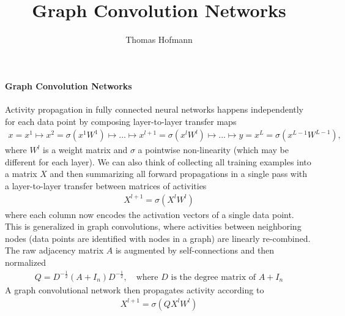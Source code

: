 \documentclass[12pt,a4paper]{article}
\author{Thomas Hofmann}
\title{Graph Convolution Networks}
\begin{document}
\maketitle

\paragraph{Graph Convolution Networks}
Activity propagation in fully connected neural networks happens independently for each data point by composing layer-to-layer transfer maps 
\begin{align}
x= x^1 \mapsto x^2 = \sigma(x^1 W^1) \mapsto ... \mapsto  x^{l+1} = \sigma(x^l W^l) \mapsto ... \mapsto y=x^L = \sigma(x^{L-1} W^{L-1} ),
\end{align}
where $W^l$ is a weight matrix and $\sigma$ a pointwise non-linearity (which may be different for each layer). We can also think of collecting all training examples into a matrix $X$ and then summarizing all forward propagations in a single pass with a layer-to-layer transfer between matrices of activities 
\begin{align}
X^{l+1} = \sigma(X^l W^{l} )
\end{align}
where each column  now encodes the activation vectors of a single data point. This is generalized in graph convolutions, where activities between neighboring nodes (data points are identified with nodes in a graph) are linearly re-combined. The raw adjacency matrix $A$ is augmented by self-connections and then normalized
\begin{align}
Q = D^{-\frac 12}(A +  I_n)D^{-\frac 12}, \quad \text{where $D$ is the degree matrix of $A+ I_n$}
\end{align} 
A graph convolutional network \cite{kipf2016semi} then propagates activity according to
\begin{align}
X^{l+1} = \sigma(Q X^l W^{l} )
\end{align}
\end{document}
